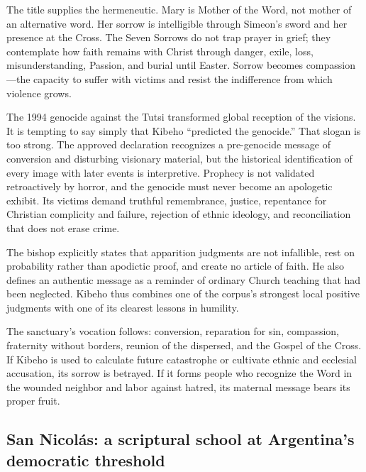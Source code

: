 The title supplies the hermeneutic. Mary is Mother of the Word, not mother of an alternative word. Her sorrow is intelligible through Simeon's sword and her presence at the Cross. The Seven Sorrows do not trap prayer in grief; they contemplate how faith remains with Christ through danger, exile, loss, misunderstanding, Passion, and burial until Easter. Sorrow becomes compassion---the capacity to suffer with victims and resist the indifference from which violence grows.

The 1994 genocide against the Tutsi transformed global reception of the visions. It is tempting to say simply that Kibeho ``predicted the genocide.'' That slogan is too strong. The approved declaration recognizes a pre-genocide message of conversion and disturbing visionary material, but the historical identification of every image with later events is interpretive. Prophecy is not validated retroactively by horror, and the genocide must never become an apologetic exhibit. Its victims demand truthful remembrance, justice, repentance for Christian complicity and failure, rejection of ethnic ideology, and reconciliation that does not erase crime.

The bishop explicitly states that apparition judgments are not infallible, rest on probability rather than apodictic proof, and create no article of faith. He also defines an authentic message as a reminder of ordinary Church teaching that had been neglected. Kibeho thus combines one of the corpus's strongest local positive judgments with one of its clearest lessons in humility.

The sanctuary's vocation follows: conversion, reparation for sin, compassion, fraternity without borders, reunion of the dispersed, and the Gospel of the Cross. If Kibeho is used to calculate future catastrophe or cultivate ethnic and ecclesial accusation, its sorrow is betrayed. If it forms people who recognize the Word in the wounded neighbor and labor against hatred, its maternal message bears its proper fruit.

\subsection{San Nicolás: a scriptural school at Argentina's democratic threshold}


